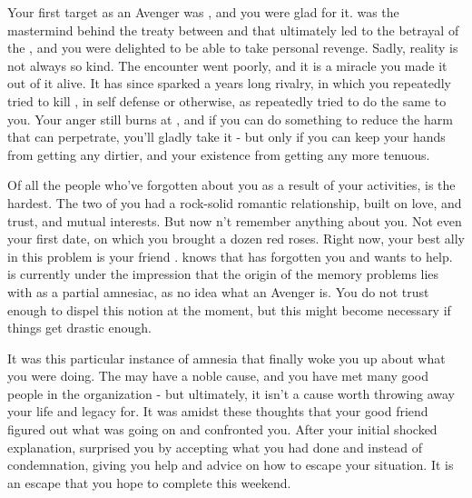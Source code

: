 \documentclass[char]{GL2020}
\begin{document}
Your first target as an Avenger was \cDiplomat{}, and you were glad for it. \cDiplomat{} was the mastermind behind the treaty between \pTech{} and \pFarm{} that ultimately led to the betrayal of the \pShip{}, and you were delighted to be able to take personal revenge. Sadly, reality is not always so kind. The encounter went poorly, and it is a miracle you made it out of it alive. It has since sparked a years long rivalry, in which you repeatedly tried to kill \cDiplomat{\them}, in self defense or otherwise, as \cDiplomat{\they} repeatedly tried to do the same to you. Your anger still burns at \cDiplomat{\them}, and if you can do something to reduce the harm that \cDiplomat{\they} can perpetrate, you’ll gladly take it - but only if you can keep your hands from getting any dirtier, and your existence from getting any more tenuous.

Of all the people who’ve forgotten about you as a result of your activities, \cHeadScientist{} is the hardest. The two of you had a rock-solid romantic relationship, built on love, and trust, and mutual interests. But now \cHeadScientist{\they} \cHeadScientist{\does}n’t remember anything about you. Not even your first date, on which you brought \cHeadScientist{\them} a dozen red roses. Right now, your best ally in this problem is your friend \cInitiate{}. \cInitiate{} knows that \cHeadScientist{} has forgotten you and wants to help. \cInitiate{} is currently under the impression that the origin of the memory problems lies with \cHeadScientist{} as a partial amnesiac, as \cInitiate{\they} \cInitiate{\have} no idea what an Avenger is. You do not trust \cInitiate{\them} enough to dispel this notion at the moment, but this might become necessary if things get drastic enough.

It was this particular instance of amnesia that finally woke you up about what you were doing. The \pGoaties{} may have a noble cause, and you have met many good people in the organization - but ultimately, it isn’t a cause worth throwing away your life and legacy for. It was amidst these thoughts that your good friend \cPrincipal{} figured out what was going on and confronted you. After your initial shocked explanation, \cPrincipal{} surprised you by accepting what you had done and instead of condemnation, giving you help and advice on how to escape your situation. It is an escape that you hope to complete this weekend.
\end{document}
